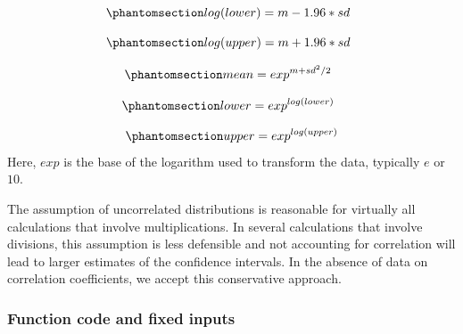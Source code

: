 \documentclass[
  letterpaper,
  DIV=11,
  numbers=noendperiod]{scrartcl}
\begin{document}
\begin{equation}\phantomsection\label{eq-loglower}{
log(lower)=m - 1.96 * sd \hspace{.2 cm}
}\end{equation}

\begin{equation}\phantomsection\label{eq-logupper}{
log(upper)=m + 1.96 * sd \hspace{.2 cm}
}\end{equation}

\begin{equation}\phantomsection\label{eq-meanexp}{
mean=exp^{m + sd^2 / 2} \hspace{.2 cm}
}\end{equation}

\begin{equation}\phantomsection\label{eq-lowerexp}{
lower=exp^{log(lower)} \hspace{.2 cm}
}\end{equation}

\begin{equation}\phantomsection\label{eq-upperexp}{
upper=exp^{log(upper)}
}\end{equation} Here, \(exp\) is the base of the logarithm used to
transform the data, typically \(e\) or \(10\).

The assumption of uncorrelated distributions is reasonable for virtually
all calculations that involve multiplications. In several calculations
that involve divisions, this assumption is less defensible and not
accounting for correlation will lead to larger estimates of the
confidence intervals. In the absence of data on correlation
coefficients, we accept this conservative approach.

\subsubsection{Function code and fixed
inputs}\label{function-code-and-fixed-inputs}
\end{document}
